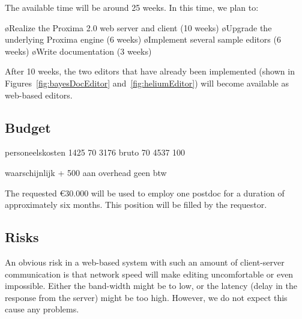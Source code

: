 \documentclass[10pt]{article}
\begin{document}
The available time will be around 25 weeks. In this time, we plan to:

\bl
\o Realize the Proxima 2.0 web server and client (10 weeks)
\o Upgrade the underlying Proxima engine (6 weeks)
\o Implement several sample editors (6 weeks)
\o Write documentation (3 weeks)
\el

After 10 weeks, the two editors that have already been implemented (shown in Figures~\ref{fig:bayesDocEditor} and~\ref{fig:heliumEditor}) will become available as web-based editors.


\subsection{Budget}

\bc
personeelskosten
1425       70%
3176 bruto 70%
4537       100%

waarschijnlijk + 500 aan overhead
geen btw
\ec

The requested \euro 30.000  will be used to employ one postdoc for a duration of approximately six months. This position will be filled by the requestor.

\subsection{Risks}


An obvious risk in a web-based system with such an amount of client-server communication is that network speed will make editing uncomfortable or even impossible. Either the band-width might be to low, or the latency (delay in the response from the server) might be too high. However, we do not expect this cause any problems.
\end{document}

